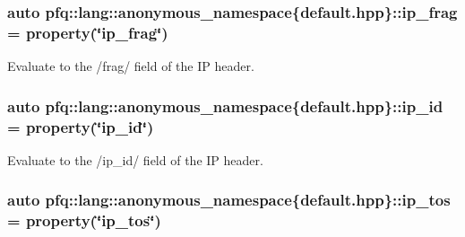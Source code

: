 \hypertarget{namespacepfq_1_1lang_1_1anonymous__namespace_02default_8hpp_03_a46050d7137792fba0ca6d1b9cb75ad0d}{
\subsubsection[{ip\+\_\+frag}]{\setlength{\rightskip}{0pt plus 5cm}auto pfq\+::lang\+::anonymous\+\_\+namespace\{default.\+hpp\}\+::ip\+\_\+frag = {\bf property}(\char`\"{}ip\+\_\+frag\char`\"{})}}\label{namespacepfq_1_1lang_1_1anonymous__namespace_02default_8hpp_03_a46050d7137792fba0ca6d1b9cb75ad0d}


Evaluate to the /frag/ field of the I\+P header. 

\hypertarget{namespacepfq_1_1lang_1_1anonymous__namespace_02default_8hpp_03_a87620275a9e9760978d5660be0582852}{
\subsubsection[{ip\+\_\+id}]{\setlength{\rightskip}{0pt plus 5cm}auto pfq\+::lang\+::anonymous\+\_\+namespace\{default.\+hpp\}\+::ip\+\_\+id = {\bf property}(\char`\"{}ip\+\_\+id\char`\"{})}}\label{namespacepfq_1_1lang_1_1anonymous__namespace_02default_8hpp_03_a87620275a9e9760978d5660be0582852}


Evaluate to the /ip\+\_\+id/ field of the I\+P header. 

\hypertarget{namespacepfq_1_1lang_1_1anonymous__namespace_02default_8hpp_03_acc5d2b786c39d4177ab37ee16ee2295d}{
\subsubsection[{ip\+\_\+tos}]{\setlength{\rightskip}{0pt plus 5cm}auto pfq\+::lang\+::anonymous\+\_\+namespace\{default.\+hpp\}\+::ip\+\_\+tos = {\bf property}(\char`\"{}ip\+\_\+tos\char`\"{})}}\label{namespacepfq_1_1lang_1_1anonymous__namespace_02default_8hpp_03_acc5d2b786c39d4177ab37ee16ee2295d}


